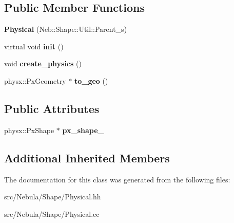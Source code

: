 \subsection*{Public Member Functions}
\begin{DoxyCompactItemize}
\item 
\hypertarget{classNeb_1_1Shape_1_1Physical_a565d6519bdd222615dbc0df773128211}{{\bfseries Physical} (Neb\-::\-Shape\-::\-Util\-::\-Parent\-\_\-s)}\label{classNeb_1_1Shape_1_1Physical_a565d6519bdd222615dbc0df773128211}

\item 
\hypertarget{classNeb_1_1Shape_1_1Physical_af52af144c95552ae55b6cc24bf4dfc59}{virtual void {\bfseries init} ()}\label{classNeb_1_1Shape_1_1Physical_af52af144c95552ae55b6cc24bf4dfc59}

\item 
\hypertarget{classNeb_1_1Shape_1_1Physical_a383490671f6f3792915196b643fcae3f}{void {\bfseries create\-\_\-physics} ()}\label{classNeb_1_1Shape_1_1Physical_a383490671f6f3792915196b643fcae3f}

\item 
\hypertarget{classNeb_1_1Shape_1_1Physical_ae2be5b67b617153a37ac2a7d32b629b9}{physx\-::\-Px\-Geometry $\ast$ {\bfseries to\-\_\-geo} ()}\label{classNeb_1_1Shape_1_1Physical_ae2be5b67b617153a37ac2a7d32b629b9}

\end{DoxyCompactItemize}
\subsection*{Public Attributes}
\begin{DoxyCompactItemize}
\item 
\hypertarget{classNeb_1_1Shape_1_1Physical_a42b1c4b3243313c543d08817cf4d7fdf}{physx\-::\-Px\-Shape $\ast$ {\bfseries px\-\_\-shape\-\_\-}}\label{classNeb_1_1Shape_1_1Physical_a42b1c4b3243313c543d08817cf4d7fdf}

\end{DoxyCompactItemize}
\subsection*{Additional Inherited Members}


The documentation for this class was generated from the following files\-:\begin{DoxyCompactItemize}
\item 
src/\-Nebula/\-Shape/Physical.\-hh\item 
src/\-Nebula/\-Shape/Physical.\-cc\end{DoxyCompactItemize}
